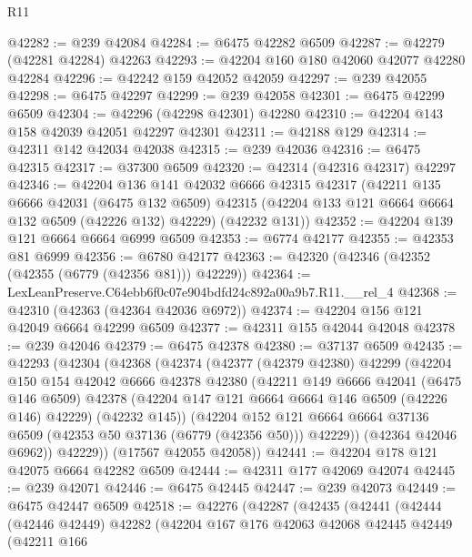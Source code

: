 \begin{lexlean}{R11}
\begin{coremodule}
@42282 := @239 @42084
@42284 := @6475 @42282 @6509
@42287 := @42279 (@42281 @42284) @42263
@42293 := @42204 @160 @180 @42060 @42077 @42280 @42284
@42296 := @42242 @159 @42052 @42059
@42297 := @239 @42055
@42298 := @6475 @42297
@42299 := @239 @42058
@42301 := @6475 @42299 @6509
@42304 := @42296 (@42298 @42301) @42280
@42310 := @42204 @143 @158 @42039 @42051 @42297 @42301
@42311 := @42188 @129
@42314 := @42311 @142 @42034 @42038
@42315 := @239 @42036
@42316 := @6475 @42315
@42317 := @37300 @6509
@42320 := @42314 (@42316 @42317) @42297
@42346 := @42204
    @136
    @141
    @42032
    @6666
    @42315
    @42317
    (@42211
      @135
      @6666
      @42031
      (@6475 @132 @6509)
      @42315
      (@42204 @133 @121 @6664 @6664 @132 @6509 (@42226 @132) @42229)
      (@42232 @131))
@42352 := @42204 @139 @121 @6664 @6664 @6999 @6509
@42353 := @6774 @42177
@42355 := @42353 @81 @6999
@42356 := @6780 @42177
@42363 := @42320 (@42346 (@42352 (@42355 (@6779 (@42356 @81))) @42229))
@42364 := LexLeanPreserve.C64ebb6f0c07e904bdfd24c892a00a9b7.R11.__rel_4
@42368 := @42310 (@42363 (@42364 @42036 @6972))
@42374 := @42204 @156 @121 @42049 @6664 @42299 @6509
@42377 := @42311 @155 @42044 @42048
@42378 := @239 @42046
@42379 := @6475 @42378
@42380 := @37137 @6509
@42435 := @42293
    (@42304
      (@42368
        (@42374
          (@42377
            (@42379 @42380)
            @42299
            (@42204
              @150
              @154
              @42042
              @6666
              @42378
              @42380
              (@42211
                @149
                @6666
                @42041
                (@6475 @146 @6509)
                @42378
                (@42204 @147 @121 @6664 @6664 @146 @6509 (@42226 @146) @42229)
                (@42232 @145))
              (@42204
                @152
                @121
                @6664
                @6664
                @37136
                @6509
                (@42353 @50 @37136 (@6779 (@42356 @50)))
                @42229))
            (@42364 @42046 @6962))
          @42229))
      (@17567 @42055 @42058))
@42441 := @42204 @178 @121 @42075 @6664 @42282 @6509
@42444 := @42311 @177 @42069 @42074
@42445 := @239 @42071
@42446 := @6475 @42445
@42447 := @239 @42073
@42449 := @6475 @42447 @6509
@42518 := @42276
    (@42287
      (@42435
        (@42441
          (@42444
            (@42446 @42449)
            @42282
            (@42204
              @167
              @176
              @42063
              @42068
              @42445
              @42449
              (@42211
                @166

\end{coremodule}
\end{lexlean}
